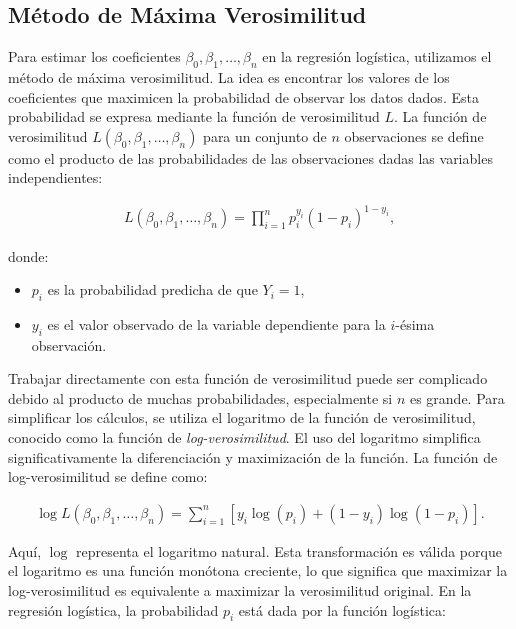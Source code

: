 \documentclass[12pt]{article}
\begin{document}
\subsection{Método de Máxima Verosimilitud}

Para estimar los coeficientes $\beta_0, \beta_1, \ldots, \beta_n$ en la regresión logística, utilizamos el método de máxima verosimilitud. La idea es encontrar los valores de los coeficientes que maximicen la probabilidad de observar los datos dados. Esta probabilidad se expresa mediante la función de verosimilitud $L$. La función de verosimilitud $L(\beta_0, \beta_1, \ldots, \beta_n)$ para un conjunto de $n$ observaciones se define como el producto de las probabilidades de las observaciones dadas las variables independientes:

\begin{eqnarray*}%
L(\beta_0, \beta_1, \ldots, \beta_n) = \prod_{i=1}^{n} p_i^{y_i} (1 - p_i)^{1 - y_i},
\end{eqnarray*}

donde:
\begin{itemize}
    \item $p_i$ es la probabilidad predicha de que $Y_i = 1$,
    \item $y_i$ es el valor observado de la variable dependiente para la $i$-ésima observación.
\end{itemize}

Trabajar directamente con esta función de verosimilitud puede ser complicado debido al producto de muchas probabilidades, especialmente si $n$ es grande. Para simplificar los cálculos, se utiliza el logaritmo de la función de verosimilitud, conocido como la función de \textit{log-verosimilitud}. El uso del logaritmo simplifica significativamente la diferenciación y maximización de la función. La función de log-verosimilitud se define como:

\begin{eqnarray*}
\log L(\beta_0, \beta_1, \ldots, \beta_n) = \sum_{i=1}^{n} \left[ y_i \log(p_i) + (1 - y_i) \log(1 - p_i) \right].
\end{eqnarray*}

Aquí, $\log$ representa el logaritmo natural. Esta transformación es válida porque el logaritmo es una función monótona creciente, lo que significa que maximizar la log-verosimilitud es equivalente a maximizar la verosimilitud original. En la regresión logística, la probabilidad $p_i$ está dada por la función logística:
\end{document}
